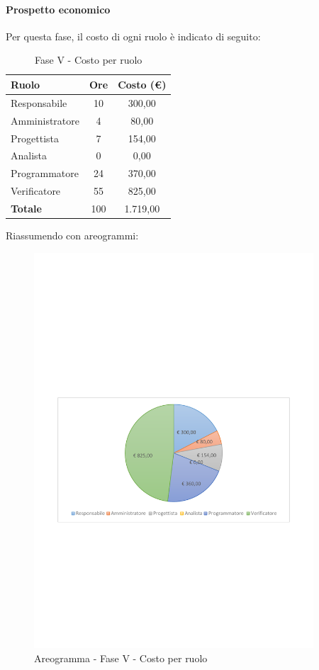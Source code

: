 \documentclass[../PianoProgetto.tex]{subfiles}
\begin{document}
	\paragraph{Prospetto economico}
					Per questa fase, il costo di ogni ruolo è indicato di seguito:
	\begin{table}[h]
		\centering
	
		\begin{tabular}{l * {2}{c}}
			\toprule
			\textbf{Ruolo} & \textbf{Ore} & \textbf{Costo (\euro{})} \\
			\midrule
			Responsabile &	10 &  300,00 \\
			Amministratore & 4 &  80,00 \\
			Progettista & 7 & 154,00 \\
			Analista & 0 & 0,00 \\
			Programmatore & 24 & 370,00 \\
			Verificatore & 55 & 825,00 \\
			\midrule		
			\textbf{Totale} & 100 & 1.719,00 \\
			\bottomrule	
		\end{tabular}
		\caption{Fase V - Costo per ruolo}
		\label{tab:faseV_costo}
	\end{table}
\vfill	
	Riassumendo con areogrammi:

	\begin{figure}[!h]
		\centering
		\includegraphics[width=0.93\textwidth , trim=2cm 9.5cm 2cm 11cm]{grafici/V/V-costo}
			\caption{Areogramma - Fase V - Costo per ruolo}
		\label{fig:CircleChart-faseV_costo}
	\end{figure}
\vfill	
\newpage
\end{document}

